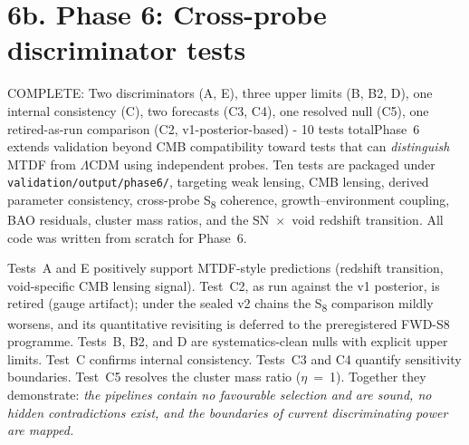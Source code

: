 \documentclass[11pt,a4paper]{article}
\begin{document}
\section{6b. Phase 6: Cross-probe discriminator tests}
\label{sec:sec6b}
COMPLETE: Two discriminators (A, E), three upper limits (B, B2, D), one internal consistency (C), two forecasts (C3, C4), one resolved null (C5), one retired-as-run comparison (C2, v1-posterior-based)  -  10 tests totalPhase~6 extends validation beyond CMB compatibility toward tests that can \emph{distinguish} MTDF from $\Lambda$CDM using independent probes. Ten tests are packaged under \texttt{validation/\allowbreak{}output/\allowbreak{}phase6/\allowbreak{}}, targeting weak lensing, CMB lensing, derived parameter consistency, cross-probe S\textsubscript{8} coherence, growth--environment coupling, BAO residuals, cluster mass ratios, and the SN~$\times$~void redshift transition. All code was written from scratch for Phase~6.

Tests~A and E positively support MTDF-style predictions (redshift transition, void-specific CMB lensing signal). Test~C2, as run against the v1 posterior, is retired (gauge artifact); under the sealed v2 chains the S\textsubscript{8} comparison mildly worsens, and its quantitative revisiting is deferred to the preregistered FWD-S8 programme. Tests~B, B2, and D are systematics-clean nulls with explicit upper limits. Test~C confirms internal consistency. Tests~C3 and C4 quantify sensitivity boundaries. Test~C5 resolves the cluster mass ratio ($\eta$~=~1). Together they demonstrate: \emph{the pipelines contain no favourable selection and are sound, no hidden contradictions exist, and the boundaries of current discriminating power are mapped.}
\end{document}
